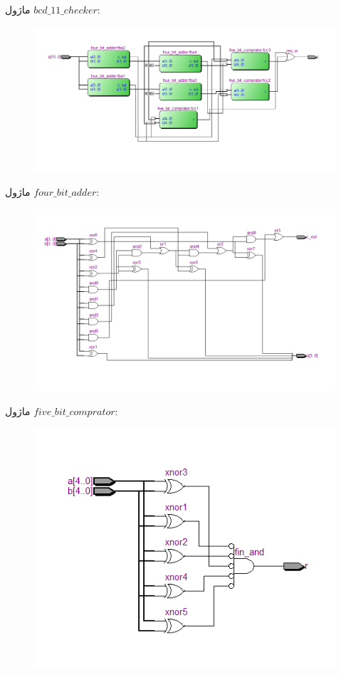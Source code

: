 \documentclass[a4paper,12pt]{article}
\begin{document}
ماژول
$bcd\_11\_checker$:
\begin{figure}[H]
 \centering
  \includegraphics[width=0.8\linewidth]{sh4}
\end{figure}
ماژول
$four\_bit\_adder$:
\begin{figure}[H]
 \centering
  \includegraphics[width=0.8\linewidth]{sh5}
\end{figure}
ماژول
$five\_bit\_comprator$:
\begin{figure}[H]
 \centering
  \includegraphics[width=0.8\linewidth]{sh6}
\end{figure}
\end{document}
